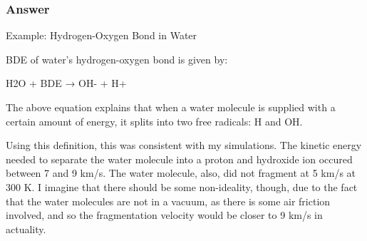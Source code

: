 \documentclass[12pt]{article}
\begin{document}
\subsubsection{Answer}
Example: Hydrogen-Oxygen Bond in Water

BDE of water’s hydrogen-oxygen bond is given by:

H2O + BDE → OH- + H+

The above equation explains that when a water molecule is supplied with a certain amount of energy, it splits into two free radicals: H and OH.

Using this definition, this was consistent with my simulations. The kinetic energy needed to separate the water molecule into a proton and hydroxide ion occured between 7 and 9 km/s. The water molecule, also, did not fragment at 5 km/s at 300 K. I imagine that there should be some non-ideality, though, due to the fact that the water molecules are not in a vacuum, as there is some air friction involved, and so the fragmentation velocity would be closer to 9 km/s in actuality.
\end{document}
